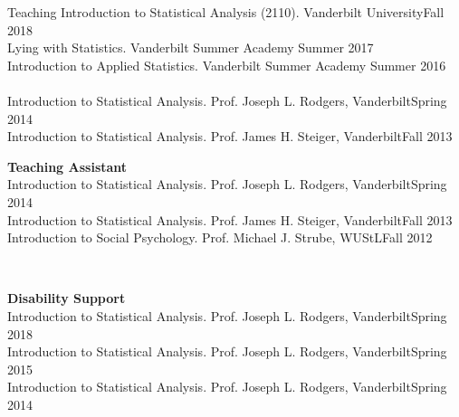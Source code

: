 \begin{rSection}{\textrm{Teaching}}
Introduction to Statistical Analysis (2110). Vanderbilt University\hfill {Fall 2018}\\
Lying with Statistics. Vanderbilt Summer Academy \hfill{Summer 2017}\\
Introduction to Applied Statistics. Vanderbilt Summer Academy \hfill{Summer 2016}\smallskip\\
\\
Introduction to Statistical Analysis. Prof. Joseph L. Rodgers, Vanderbilt\hfill{Spring 2014}\\
Introduction to Statistical Analysis. Prof. James H. Steiger, Vanderbilt\hfill{Fall 2013}%
\medskip\\
\begin{minipage}{\linewidth}{\large {\bf Teaching Assistant}}\\
Introduction to Statistical Analysis. Prof. Joseph L. Rodgers, Vanderbilt\hfill  {Spring 2014}\\
Introduction to Statistical Analysis. Prof. James H. Steiger, Vanderbilt\hfill  {Fall 2013}\\
Introduction to Social Psychology. Prof. Michael J. Strube, WUStL\hfill{Fall 2012}\end{minipage}\medskip\\
\begin{minipage}{\linewidth}{\large {\bf Disability Support}}\\
Introduction to Statistical Analysis. Prof. Joseph L. Rodgers, Vanderbilt\hfill  {Spring 2018}\\
Introduction to Statistical Analysis. Prof. Joseph L. Rodgers, Vanderbilt\hfill  {Spring 2015}\\
Introduction to Statistical Analysis. Prof. Joseph L. Rodgers, Vanderbilt\hfill{Spring 2014}\end{minipage}%
\end{rSection}
